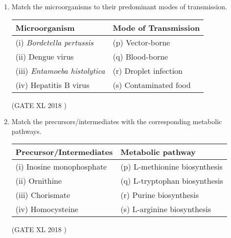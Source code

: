 \documentclass[14pt]{extarticle}
\begin{document}
\begin{flushleft}
\begin{enumerate}
\item Match the microorganisms to their predominant modes of transmission.  
\begin{tabular}{|l|l|}
\hline
\textbf{Microorganism} & \textbf{Mode of Transmission} \\ \hline
(i) \textit{Bordetella pertussis} & (p) Vector-borne \\
(ii) Dengue virus & (q) Blood-borne \\
(iii) \textit{Entamoeba histolytica} & (r) Droplet infection \\
(iv) Hepatitis B virus & (s) Contaminated food \\ \hline
\end{tabular}
\hfill(GATE XL 2018 )\\
\begin{enumerate}
\end{enumerate}

\item Match the precursors/intermediates with the corresponding metabolic pathways.  \\
\begin{tabular}{|l|l|}
\hline
\textbf{Precursor/Intermediates} & \textbf{Metabolic pathway} \\ \hline
(i) Inosine monophosphate & (p) L-methionine biosynthesis \\
(ii) Ornithine & (q) L-tryptophan biosynthesis \\
(iii) Chorismate & (r) Purine biosynthesis \\
(iv) Homocysteine & (s) L-arginine biosynthesis \\ \hline
\end{tabular}
\hfill(GATE XL 2018 )\\
\begin{enumerate}
\end{enumerate}


\end{enumerate}
\end{flushleft}
\end{document}
